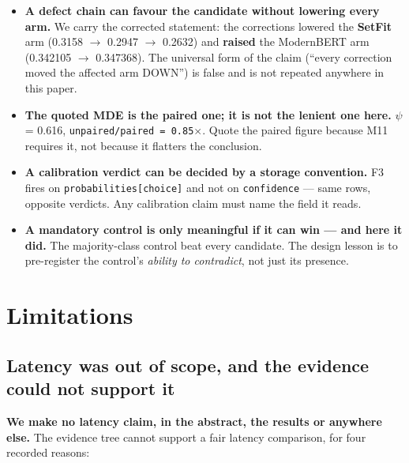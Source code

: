 \documentclass[10pt]{article}
\begin{document}
\begin{itemize}
\item \textbf{A defect chain can favour the candidate without lowering every arm.} We carry the corrected statement: the corrections lowered the \textbf{SetFit} arm (0.3158 $\to$ 0.2947 $\to$ 0.2632) and \textbf{raised} the ModernBERT arm (0.342105 $\to$ 0.347368). The universal form of the claim (``every correction moved the affected arm DOWN'') is false and is not repeated anywhere in this paper.
\item \textbf{The quoted MDE is the paired one; it is not the lenient one here.} $\psi$ = 0.616, \texttt{unpaired/paired = 0.85$\times$}. Quote the paired figure because M11 requires it, not because it flatters the conclusion.
\item \textbf{A calibration verdict can be decided by a storage convention.} F3 fires on \texttt{probabilities[choice]} and not on \texttt{confidence} --- same rows, opposite verdicts. Any calibration claim must name the field it reads.
\item \textbf{A mandatory control is only meaningful if it can win --- and here it did.} The majority-class control beat every candidate. The design lesson is to pre-register the control's \emph{ability to contradict}, not just its presence.
\end{itemize}

\section{Limitations}

\subsection{Latency was out of scope, and the evidence could not support it}

\textbf{We make no latency claim, in the abstract, the results or anywhere else.} The evidence tree cannot support a fair latency comparison, for four recorded reasons:
\end{document}
